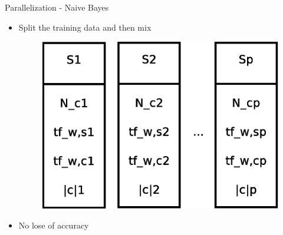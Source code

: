 \documentclass{beamer}
\begin{document}

\begin{frame}{Parallelization - Naive Bayes}

\begin{itemize}

\item Split the training data and then mix

\begin{figure}[!htb]
  \centering
  \includegraphics[scale=0.40]{presentation/naive_bayes_split.eps}
\end{figure}

\item No lose of accuracy 

\end{itemize}

\end{frame}

\end{document}
